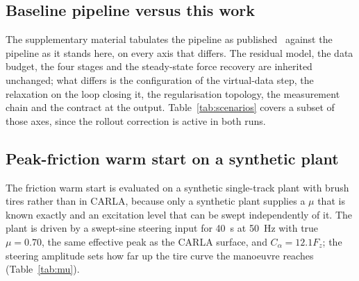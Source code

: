 \subsection{Baseline pipeline versus this work}
\label{subsec:baselinecmp}

The supplementary material tabulates the pipeline as
published~\cite{ontrack2025} against the pipeline as it stands here, on every
axis that differs. The residual model, the data budget, the four stages and the
steady-state force recovery are inherited unchanged; what differs is the
configuration of the virtual-data step, the relaxation on the loop closing it,
the regularisation topology, the measurement chain and the contract at the
output. Table~\ref{tab:scenarios} covers a subset of those axes, since the
rollout correction is active in both runs.

\subsection{Peak-friction warm start on a synthetic plant}
\label{subsec:mu}

The friction warm start is evaluated on a synthetic single-track plant with
brush tires rather than in CARLA, because only a synthetic plant supplies a
$\mu$ that is known exactly and an excitation level that can be swept
independently of it. The plant is driven by a swept-sine steering input for
\SI{40}{\second} at \SI{50}{\hertz} with true $\mu=0.70$, the same effective
peak as the CARLA surface, and $C_{\alpha}=12.1F_{z}$; the steering amplitude
sets how far up the tire curve the manoeuvre reaches
(Table~\ref{tab:mu}).

